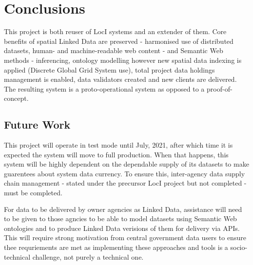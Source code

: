 \documentclass[runningheads]{llncs}
\begin{document}
\section{Conclusions}\label{sec:conclusions}
This project is both reuser of LocI systems and an extender of them. Core benefits of spatial Linked Data are preserved - harmonised use of distributed datasets, human- and machine-readable 
web content - and Semantic Web methods - inferencing, ontology modelling however new spatial data indexing is applied (Discrete Global Grid System use), total project data holdings management is
enabled, data validators created and new clients are delivered. The resulting system is a proto-operational system as opposed to a proof-of-concept.


\subsection{Future Work}\label{sec:futurework}
This project will operate in test mode until July, 2021, after which time it is expected the system will move to full production. When that happens, this system will be highly dependent on the 
dependable supply of its datasets to make guarentees about system data currency. To ensure this, inter-agency data supply chain management - stated under the precursor LocI project but not completed - 
must be completed. 

For data to be delivered by owner agencies as Linked Data, assistance will need to be given to those agncies to be able to model datasets using Semantic Web ontologies and to produce Linked Data verisions
of them for delivery via APIs. This will require strong motivation from central government data users to ensure thee requriements are met as implementing these approaches and tools is a socio-technical
challenge, not purely a technical one.


%
%
%


%




\end{document}
